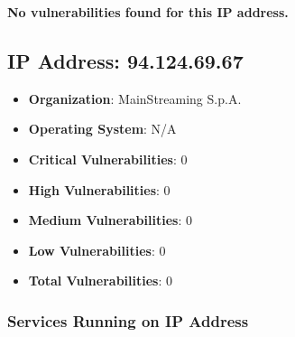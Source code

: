 \documentclass{article}
\begin{document}
\textbf{No vulnerabilities found for this IP address.}




\clearpage



\subsection*{IP Address: 94.124.69.67}

\begin{itemize}
    \item \textbf{Organization}: MainStreaming S.p.A.
    \item \textbf{Operating System}:  N/A 
    \item \textbf{Critical Vulnerabilities}: 0
    \item \textbf{High Vulnerabilities}: 0
    \item \textbf{Medium Vulnerabilities}: 0
    \item \textbf{Low Vulnerabilities}: 0
    \item \textbf{Total Vulnerabilities}: 0
\end{itemize}

\subsubsection*{Services Running on IP Address}
\end{document}
